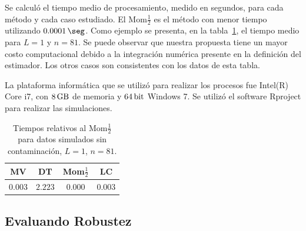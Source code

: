 Se calculó el tiempo medio de procesamiento, medido en segundos, para cada método y cada caso estudiado. El Mom$\frac{1}{2}$ es el método con menor tiempo utilizando $\SI{0.0001}{\seg}$. Como  ejemplo se presenta, en la tabla~\ref{tablaDeTiemposmedios}, el tiempo medio para $L=1$ y $n=81$.  Se puede observar que nuestra propuesta tiene un mayor costo computacional debido a la integración numérica presente en la definición del estimador. Los otros casos son consistentes con los datos de esta tabla.

La plataforma informática que se utilizó para realizar los procesos fue Intel(R) Core i7, con $\SI{8}{\giga\byte}$ de memoria y $\SI{64}{\bit}$ Windows 7. Se utilizó el software Rproject para realizar las simulaciones.


\begin{table}[htb]
	\caption{\label{tablaDeTiemposmedios}\small Tiempos relativos al Mom$\frac{1}{2}$ para datos simulados sin contaminación, $L=1$, $n=81$. }
	\centering
	\begin{tabular}{cccc}
		\toprule
		MV& DT& Mom$\frac{1}{2}$ & LC \\
		\midrule
		$0.003$& $2.223$ & $0.000$ &$0.003$ \\
		\bottomrule
	\end{tabular}
\end{table}
\subsection{Evaluando Robustez}

